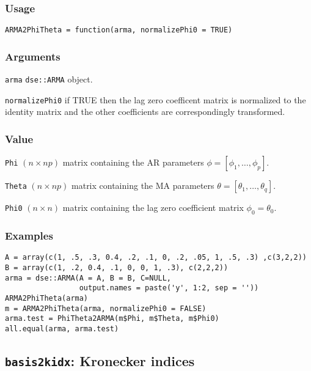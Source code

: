 \documentclass[]{article}
\begin{document}
\subsubsection*{Usage}\begin{verbatim}
ARMA2PhiTheta = function(arma, normalizePhi0 = TRUE)
\end{verbatim}\subsubsection*{Arguments}\begin{description}
\item \texttt{arma} \texttt{dse::ARMA} object.
\item \texttt{normalizePhi0} if TRUE then the lag zero coefficent matrix 
       is normalized to the identity matrix and the other coefficients are 
       correspondingly transformed.
\end{description}\subsubsection*{Value}\begin{description}
\item \texttt{Phi} $(n \times np)$ matrix containing the AR parameters
       $\phi = [\phi_1,\ldots,\phi_p]$.
\item \texttt{Theta} $(n \times np)$ matrix containing the MA parameters
       $\theta = [\theta_1,\ldots,\theta_q]$.
\item \texttt{Phi0} $(n \times n)$ matrix containing the lag zero coefficient 
       matrix $\phi_0 = \theta_0$.
\end{description}\subsubsection*{Examples}\begin{verbatim}
A = array(c(1, .5, .3, 0.4, .2, .1, 0, .2, .05, 1, .5, .3) ,c(3,2,2))
B = array(c(1, .2, 0.4, .1, 0, 0, 1, .3), c(2,2,2))
arma = dse::ARMA(A = A, B = B, C=NULL,
                 output.names = paste('y', 1:2, sep = ''))
ARMA2PhiTheta(arma)
m = ARMA2PhiTheta(arma, normalizePhi0 = FALSE)
arma.test = PhiTheta2ARMA(m$Phi, m$Theta, m$Phi0)
all.equal(arma, arma.test)
\end{verbatim}

\subsection{\texorpdfstring{\texttt{basis2kidx}: Kronecker
indices}{basis2kidx: Kronecker indices}}\label{basis2kidx-kronecker-indices}
\end{document}
